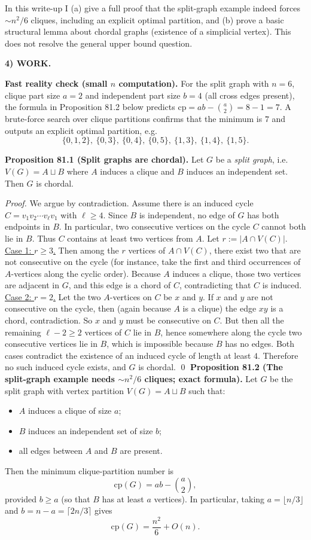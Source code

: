 In this write-up I (a) give a full proof that the split-graph example indeed forces $\sim n^2/6$ cliques, including an explicit optimal partition, and (b) prove a basic structural lemma about chordal graphs (existence of a simplicial vertex). This does not resolve the general upper bound question.

\medskip
\noindent\textbf{4) WORK.}

\noindent\textbf{Fast reality check (small $n$ computation).}
For the split graph with $n=6$, clique part size $a=2$ and independent part size $b=4$ (all cross edges present), the formula in Proposition 81.2 below predicts
\(\mathrm{cp}=ab-\binom{a}{2}=8-1=7\).
A brute-force search over clique partitions confirms that the minimum is $7$ and outputs an explicit optimal partition, e.g.
\[
\{0,1,2\},\ \{0,3\},\ \{0,4\},\ \{0,5\},\ \{1,3\},\ \{1,4\},\ \{1,5\}.
\]

\medskip
\noindent\textbf{Proposition 81.1 (Split graphs are chordal).}
Let $G$ be a \emph{split graph}, i.e. $V(G)=A\sqcup B$ where $A$ induces a clique and $B$ induces an independent set. Then $G$ is chordal.

\emph{Proof.}
We argue by contradiction. Assume there is an induced cycle $C=v_1v_2\cdots v_\ell v_1$ with $\ell\ge 4$.
Since $B$ is independent, no edge of $G$ has both endpoints in $B$. In particular, two consecutive vertices on the cycle $C$ cannot both lie in $B$. Thus $C$ contains at least two vertices from $A$.
Let $r:=|A\cap V(C)|$.
\underline{Case 1: $r\ge 3$.} Then among the $r$ vertices of $A\cap V(C)$, there exist two that are not consecutive on the cycle (for instance, take the first and third occurrences of $A$-vertices along the cyclic order). Because $A$ induces a clique, those two vertices are adjacent in $G$, and this edge is a chord of $C$, contradicting that $C$ is induced.
\underline{Case 2: $r=2$.} Let the two $A$-vertices on $C$ be $x$ and $y$. If $x$ and $y$ are not consecutive on the cycle, then (again because $A$ is a clique) the edge $xy$ is a chord, contradiction. So $x$ and $y$ must be consecutive on $C$. But then all the remaining $\ell-2\ge 2$ vertices of $C$ lie in $B$, hence somewhere along the cycle two consecutive vertices lie in $B$, which is impossible because $B$ has no edges.
Both cases contradict the existence of an induced cycle of length at least $4$. Therefore no such induced cycle exists, and $G$ is chordal. \qed
\medskip
\noindent\textbf{Proposition 81.2 (The split-graph example needs $\sim n^2/6$ cliques; exact formula).}
Let $G$ be the split graph with vertex partition $V(G)=A\sqcup B$ such that:
\begin{itemize}
\item $A$ induces a clique of size $a$;
\item $B$ induces an independent set of size $b$;
\item all edges between $A$ and $B$ are present.
\end{itemize}
Then the minimum clique-partition number is
\[
\mathrm{cp}(G)=ab-\binom{a}{2},
\]
provided $b\ge a$ (so that $B$ has at least $a$ vertices).
In particular, taking $a=\lfloor n/3\rfloor$ and $b=n-a=\lceil 2n/3\rceil$ gives
\[
\mathrm{cp}(G)=\frac{n^2}{6}+O(n).
\]

